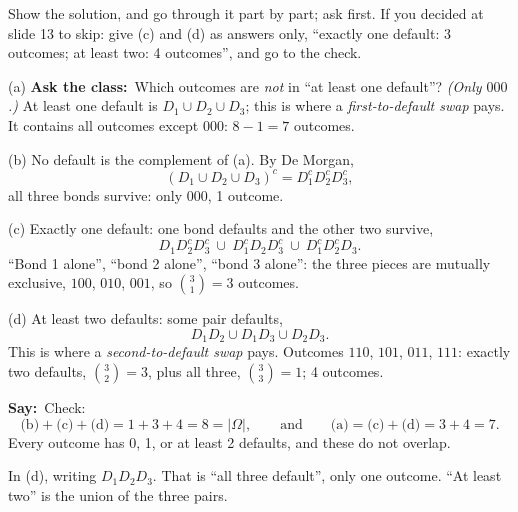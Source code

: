 \documentclass[11pt,a4paper,parskip=half]{scrartcl}
\newcommand{\Om}{\Omega}
\newcommand{\say}{\textbf{\color{teal}Say:}\ }
\newcommand{\ask}{\textbf{\color{navy}Ask the class:}\ }
\begin{document}
\begin{slidecue}
	Show the solution, and go through it part by part; ask first. If you
	decided at slide 13 to skip: give (c) and (d) as answers only, ``exactly
	one default: 3 outcomes; at least two: 4 outcomes'', and go to the check.
\end{slidecue}

(a) \ask Which outcomes are \emph{not} in ``at least one default''?
\emph{(Only $000$.)} At least one default is $D_1\cup D_2\cup D_3$; this is
where a \emph{first-to-default swap} pays. It contains all outcomes except
$000$: $8-1=7$ outcomes.

(b) No default is the complement of (a). By De Morgan,
\[ (D_1\cup D_2\cup D_3)^c=D_1^cD_2^cD_3^c, \]
all three bonds survive: only $000$, 1 outcome.

(c) Exactly one default: one bond defaults and the other two survive,
\[ D_1D_2^cD_3^c\ \cup\ D_1^cD_2D_3^c\ \cup\ D_1^cD_2^cD_3. \]
``Bond 1 alone'', ``bond 2 alone'', ``bond 3 alone'': the three pieces are
mutually exclusive, $100$, $010$, $001$, so $\binom31=3$ outcomes.

(d) At least two defaults: some pair defaults,
\[ D_1D_2\cup D_1D_3\cup D_2D_3. \]
This is where a \emph{second-to-default swap} pays. Outcomes $110$, $101$,
$011$, $111$: exactly two defaults, $\binom32=3$, plus all three,
$\binom33=1$; 4 outcomes.

\say Check:
\[ \text{(b)}+\text{(c)}+\text{(d)}=1+3+4=8=|\Om|,\qquad\text{and}\qquad
	\text{(a)}=\text{(c)}+\text{(d)}=3+4=7. \]
Every outcome has 0, 1, or at least 2 defaults, and these do not overlap.

\begin{mistake}
	In (d), writing $D_1D_2D_3$. That is ``all three default'', only one
	outcome. ``At least two'' is the union of the three pairs.
\end{mistake}
\end{document}
